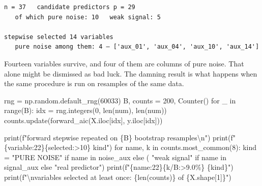 \documentclass[
  letterpaper,
  10pt,
  twoside,
  openright,
  numbers=noenddot,
  chapterprefix=true]{scrbook}
\newenvironment{Shaded}{}{}
\newcommand{\BuiltInTok}[1]{\textcolor[rgb]{0.84,0.23,0.29}{#1}}
\newcommand{\CharTok}[1]{\textcolor[rgb]{0.01,0.18,0.38}{#1}}
\newcommand{\ControlFlowTok}[1]{\textcolor[rgb]{0.84,0.23,0.29}{#1}}
\newcommand{\DecValTok}[1]{\textcolor[rgb]{0.00,0.36,0.77}{#1}}
\newcommand{\KeywordTok}[1]{\textcolor[rgb]{0.84,0.23,0.29}{#1}}
\newcommand{\NormalTok}[1]{\textcolor[rgb]{0.14,0.16,0.18}{#1}}
\newcommand{\OperatorTok}[1]{\textcolor[rgb]{0.14,0.16,0.18}{#1}}
\newcommand{\SpecialCharTok}[1]{\textcolor[rgb]{0.00,0.36,0.77}{#1}}
\newcommand{\SpecialStringTok}[1]{\textcolor[rgb]{0.01,0.18,0.38}{#1}}
\newcommand{\StringTok}[1]{\textcolor[rgb]{0.01,0.18,0.38}{#1}}
\begin{document}
\begin{verbatim}
n = 37   candidate predictors p = 29
   of which pure noise: 10   weak signal: 5

stepwise selected 14 variables
   pure noise among them: 4 — ['aux_01', 'aux_04', 'aux_10', 'aux_14']
\end{verbatim}

Fourteen variables survive, and four of them are columns of pure noise.
That alone might be dismissed as bad luck. The damning result is what
happens when the same procedure is run on resamples of the same data.

\label{check-bootstrap}
\begin{Shaded}
\begin{Highlighting}[]
\NormalTok{rng }\OperatorTok{=}\NormalTok{ np.random.default\_rng(}\DecValTok{60033}\NormalTok{)}
\NormalTok{B, counts }\OperatorTok{=} \DecValTok{200}\NormalTok{, Counter()}
\ControlFlowTok{for}\NormalTok{ \_ }\KeywordTok{in} \BuiltInTok{range}\NormalTok{(B):}
\NormalTok{    idx }\OperatorTok{=}\NormalTok{ rng.integers(}\DecValTok{0}\NormalTok{, }\BuiltInTok{len}\NormalTok{(num), }\BuiltInTok{len}\NormalTok{(num))}
\NormalTok{    counts.update(forward\_aic(X.iloc[idx], y.iloc[idx]))}

\BuiltInTok{print}\NormalTok{(}\SpecialStringTok{f"forward stepwise repeated on }\SpecialCharTok{\{}\NormalTok{B}\SpecialCharTok{\}}\SpecialStringTok{ bootstrap resamples}\CharTok{\textbackslash{}n}\SpecialStringTok{"}\NormalTok{)}
\BuiltInTok{print}\NormalTok{(}\SpecialStringTok{f"}\SpecialCharTok{\{}\StringTok{\textquotesingle{}variable\textquotesingle{}}\SpecialCharTok{:22\}\{}\StringTok{\textquotesingle{}selected\textquotesingle{}}\SpecialCharTok{:\textgreater{}10\}}\SpecialStringTok{   kind"}\NormalTok{)}
\ControlFlowTok{for}\NormalTok{ name, k }\KeywordTok{in}\NormalTok{ counts.most\_common(}\DecValTok{8}\NormalTok{):}
\NormalTok{    kind }\OperatorTok{=} \StringTok{"PURE NOISE"} \ControlFlowTok{if}\NormalTok{ name }\KeywordTok{in}\NormalTok{ noise\_aux }\ControlFlowTok{else}\NormalTok{ (}
        \StringTok{"weak signal"} \ControlFlowTok{if}\NormalTok{ name }\KeywordTok{in}\NormalTok{ signal\_aux }\ControlFlowTok{else} \StringTok{"real predictor"}\NormalTok{)}
    \BuiltInTok{print}\NormalTok{(}\SpecialStringTok{f"}\SpecialCharTok{\{}\NormalTok{name}\SpecialCharTok{:22\}\{}\NormalTok{k}\OperatorTok{/}\NormalTok{B}\SpecialCharTok{:\textgreater{}9.0\%\}}\SpecialStringTok{   }\SpecialCharTok{\{}\NormalTok{kind}\SpecialCharTok{\}}\SpecialStringTok{"}\NormalTok{)}
\BuiltInTok{print}\NormalTok{(}\SpecialStringTok{f"}\CharTok{\textbackslash{}n}\SpecialStringTok{variables selected at least once: }\SpecialCharTok{\{}\BuiltInTok{len}\NormalTok{(counts)}\SpecialCharTok{\}}\SpecialStringTok{ of }\SpecialCharTok{\{}\NormalTok{X}\SpecialCharTok{.}\NormalTok{shape[}\DecValTok{1}\NormalTok{]}\SpecialCharTok{\}}\SpecialStringTok{"}\NormalTok{)}
\end{Highlighting}
\end{Shaded}
\end{document}
